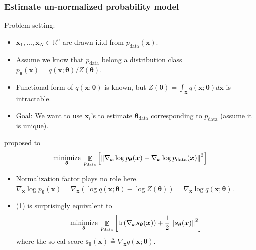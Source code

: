 \documentclass[10pt,xcolor={usenames,dvipsnames,table}]{beamer}
\begin{document}
\begin{frame}
    \frametitle{Estimate un-normalized probability model }
    Problem setting:
    \begin{itemize}
        \item $\bm{x}_1, \ldots , \bm{x}_N \in \mathbb{R}^{n}$ are drawn i.i.d from $p_{\text{data}}(\bm{x})$.
        \item Assume we know that $p_{\text{data}}$ belong a distribution class $p_{\boldsymbol \theta}(\bm{x}) = q(\bm{x}; \boldsymbol \theta)/ Z(\boldsymbol \theta)$.
        \item Functional form of $q(\bm{x}; \boldsymbol \theta)$ is known, but $Z(\boldsymbol \theta) = \int_{\bm{x}} q(\bm{x}; \boldsymbol \theta) d\bm{x}$ is intractable.
        \item Goal: We want to use $\bm{x}_i$'s to estimate $\boldsymbol \theta_{\text{data}}$ corresponding to $p_{\text{data}}$ (assume it is unique).
    \end{itemize}
\parencite{hyvarinen2005estimation} proposed to
    \begin{equation}
        \operatorname*{minimize}_{\boldsymbol \theta} \; \mathop{\mathbb{E}}_{p_{\text{data}}} \left[  \left\lVert\nabla_{\bm{x}} \log p_{\boldsymbol \theta}(\bm{x}) - \nabla_{\bm{x}} \log p_{\text{data}}(\bm{x})\right\rVert^2\right]
    \end{equation}
\begin{itemize}
    \item Normalization factor plays no role here. $\nabla_{\bm{x}} \log p_{\boldsymbol \theta}(\bm{x}) = \nabla_{\bm{x}}(\log q(\bm{x}; \boldsymbol \theta) - \log Z(\boldsymbol \theta)) = \nabla_{\bm{x}} \log q(\bm{x}; \boldsymbol \theta)$.
    \item (1)  is surprisingly equivalent to 
    \begin{equation*}
        \operatorname*{minimize}_{\boldsymbol \theta} \; \mathop{\mathbb{E}}_{p_{\text{data}}} \left[ \text{tr}(\nabla_{\bm{x}} \bm{s}_{\boldsymbol \theta}(\bm{x})) + \dfrac{1}{2} \left\lVert\bm{s}_{\boldsymbol \theta}(\bm{x})\right\rVert^2\right]
    \end{equation*}
    where the so-cal {\blue score} $\bm{s}_{\boldsymbol \theta}(\bm{x})\triangleq \nabla_{\bm{x}} q(\bm{x}; \boldsymbol \theta)$.
\end{itemize}
\end{frame}
\end{document}
